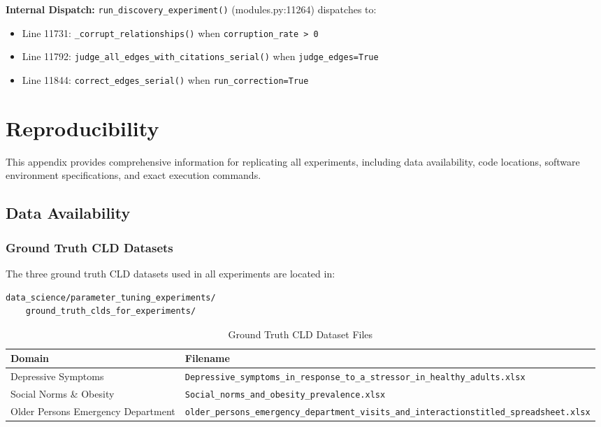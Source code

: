 \textbf{Internal Dispatch:} \texttt{run\_discovery\_experiment()} (modules.py:11264) dispatches to:
\begin{itemize}[noitemsep]
    \item Line 11731: \texttt{\_corrupt\_relationships()} when \texttt{corruption\_rate > 0}
    \item Line 11792: \texttt{judge\_all\_edges\_with\_citations\_serial()} when \texttt{judge\_edges=True}
    \item Line 11844: \texttt{correct\_edges\_serial()} when \texttt{run\_correction=True}
\end{itemize}

\section{Reproducibility}
\label{sec:reproducibility}

This appendix provides comprehensive information for replicating all experiments, including data availability, code locations, software environment specifications, and exact execution commands.

\subsection{Data Availability}
\label{sec:data_availability}

\subsubsection{Ground Truth CLD Datasets}

The three ground truth CLD datasets used in all experiments are located in:
\begin{verbatim}
data_science/parameter_tuning_experiments/
    ground_truth_clds_for_experiments/
\end{verbatim}

\begin{table}[H]
\centering
\caption{Ground Truth CLD Dataset Files}
\label{tab:gt_files}
\footnotesize
\begin{tabular}{@{}ll@{}}
\toprule
\textbf{Domain} & \textbf{Filename} \\
\midrule
Depressive Symptoms & \texttt{Depressive\_symptoms\_in\_response\_to\_a\_stressor\_in\_healthy\_adults.xlsx} \\
Social Norms \& Obesity & \texttt{Social\_norms\_and\_obesity\_prevalence.xlsx} \\
Older Persons Emergency Department & \texttt{older\_persons\_emergency\_department\_visits\_and\_interactionstitled\_spreadsheet.xlsx} \\
\bottomrule
\end{tabular}
\end{table}

